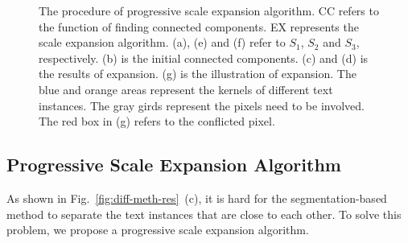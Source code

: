 \documentclass[10pt,twocolumn,letterpaper]{article}
\begin{document}
	\begin{figure}
		\centering
		\setlength{\fboxrule}{0pt}
		\caption{The procedure of progressive scale expansion algorithm. CC refers to the function of finding connected components. EX represents the scale expansion algorithm. (a), (e) and (f) refer to $S_1$, $S_2$ and $S_3$, respectively. (b) is the initial connected components. (c) and (d) is the results of expansion. (g) is the illustration of expansion. The blue and orange areas represent the kernels of different text instances. The gray girds represent the pixels need to be involved. The red box in (g) refers to the conflicted pixel.}
		\label{fig:pse}
	\end{figure}
	
	\subsection{Progressive Scale Expansion Algorithm}
	As shown in Fig.~\ref{fig:diff-meth-res}~(c), it is hard for the segmentation-based method to separate the text instances that are close to each other. To solve this problem, we propose a progressive scale expansion algorithm. 
	
	
\end{document}
